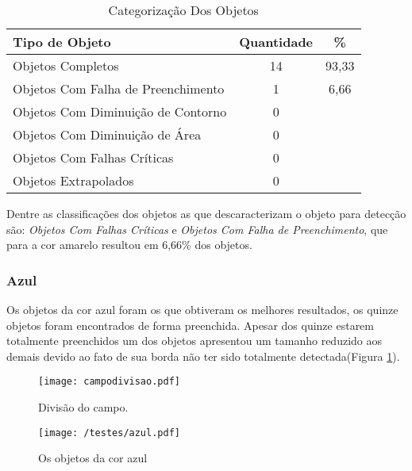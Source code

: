 	\begin{table}[H]
\centering
\begin{tabular}{l|c|c}
Tipo de Objeto & Quantidade & \%  \\%
\hline                               %
Objetos Completos & 14 & 93,33 \\
\hline 
Objetos Com Falha de Preenchimento & 1 & 6,66 \\
\hline 
Objetos Com Diminuição de Contorno & 0 &\\
\hline 
Objetos Com Diminuição de Área &  0 &\\
\hline 
Objetos Com Falhas Críticas & 0 &\\
\hline \hline 
Objetos Extrapolados & 0 &\\
\hline 
\end{tabular}
\caption{Categorização Dos Objetos}
\label{tab:amarelo}
\end{table}

Dentre as classificações dos objetos as que descaracterizam o objeto para detecção são: \textit{Objetos Com Falhas Críticas} e \textit{Objetos Com Falha de Preenchimento}, que  para a cor amarelo resultou em 6,66\% dos objetos.

\newpage
\subsubsection{Azul}

Os objetos da cor azul foram os que obtiveram os melhores resultados, os quinze objetos foram encontrados de forma preenchida. Apesar dos quinze estarem totalmente preenchidos um dos objetos apresentou um tamanho reduzido aos demais devido ao fato de sua borda não ter sido totalmente detectada(Figura \ref{fig:azul}).
	\begin{figure}[H]
		\begin{minipage}[b]{0.45\linewidth}
			\centering
			\texttt{[image: campodivisao.pdf]}
			\caption{Divisão do campo.}				
		\end{minipage}
		\hspace{0.5cm}
		\begin{minipage}[b]{0.45\linewidth}
			\centering
			\texttt{[image: /testes/azul.pdf]}
			\caption{Os objetos da cor azul}
			\label{fig:azul}
		\end{minipage}
	\end{figure}


